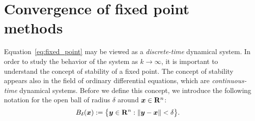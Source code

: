 \section{Convergence of fixed point methods}
\label{sec:convergence_fixed_point_methods}
Equation~\eqref{eq:fixed_point} may be viewed as a \emph{discrete-time} dynamical system.
In order to study the behavior of the system as $k \to \infty$,
it is important to understand the concept of stability of a fixed point.
The concept of stability appears also in the field of ordinary differential equations,
which are \emph{continuous-time} dynamical systems.
Before we define this concept,
we introduce the following notation
for the open ball of radius $\delta$ around $\mathbf{\boldsymbol{x}} \in \mathbf R^n$:
\[
    B_{\delta} (\mathbf{\boldsymbol{x}}) := \bigl\{ \mathbf{\boldsymbol{y}} \in \mathbf R^n : \lVert\mathbf{\boldsymbol{y}} - \mathbf{\boldsymbol{x}}\rVert < \delta \bigr\}.
\]
\vspace{-.7cm}

